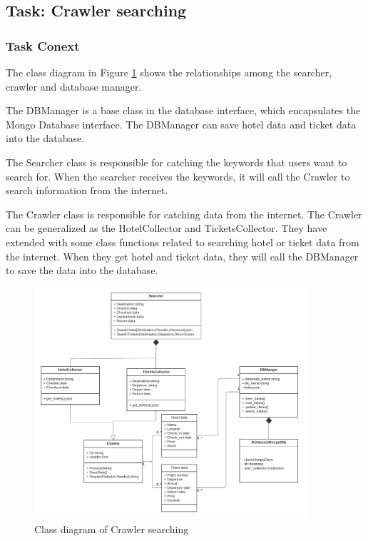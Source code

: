 \documentclass[conference]{IEEEtran}
\begin{document}
\subsection{\textbf{Task: Crawler searching }}



\subsubsection{\textbf{Task Conext }}
\textbf{}

The class diagram in Figure \ref{crawlerclass1} shows the relationships among the searcher, crawler and database manager. 

The DBManager is a base class in the database interface, which encapsulates the Mongo Database interface. The DBManager can save hotel data and ticket data into the database.

The Searcher class is responsible for catching the keywords that users want to search for. When the searcher receives the keywords, it will call the Crawler to search information from the internet.

The Crawler class is responsible for catching data from the internet. The Crawler can be generalized as the HotelCollector and TicketsCollector. They have extended with some class functions related to searching hotel or ticket data from the internet.  When they get hotel and ticket data, they will call the DBManager to save the data into the database.
\begin{figure}[htbp]
	\centerline{\includegraphics[width=0.9\textwidth]{image/crawler search class1.pdf}}
	\caption{Class diagram of Crawler searching }
	\label{crawlerclass1}
\end{figure}
\end{document}
